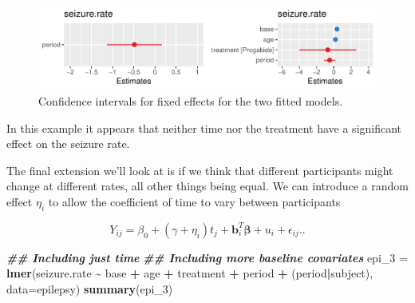 \documentclass[
  openany]{book}
\newenvironment{Shaded}{\begin{snugshade}}{\end{snugshade}}
\newcommand{\AttributeTok}[1]{\textcolor[rgb]{0.13,0.29,0.53}{#1}}
\newcommand{\DocumentationTok}[1]{\textcolor[rgb]{0.56,0.35,0.01}{\textbf{\textit{#1}}}}
\newcommand{\FunctionTok}[1]{\textcolor[rgb]{0.13,0.29,0.53}{\textbf{#1}}}
\newcommand{\NormalTok}[1]{#1}
\newcommand{\OtherTok}[1]{\textcolor[rgb]{0.56,0.35,0.01}{#1}}
\newcommand{\SpecialCharTok}[1]{\textcolor[rgb]{0.81,0.36,0.00}{\textbf{#1}}}
\theoremstyle{definition}
\theoremstyle{definition}
\theoremstyle{definition}
\theoremstyle{definition}
\theoremstyle{remark}
\begin{document}
\begin{figure}
\centering
\includegraphics{CT4H_notes_files/figure-latex/unnamed-chunk-72-1.pdf}
\caption{\label{fig:unnamed-chunk-72}Confidence intervals for fixed effects for the two fitted models.}
\end{figure}

In this example it appears that neither time nor the treatment have a significant effect on the seizure rate.

The final extension we'll look at is if we think that different participants might change at different rates, all other things being equal. We can introduce a random effect \(\eta_i\) to allow the coefficient of time to vary between participants

\begin{equation}
Y_{ij} = \beta_0 + \left(\gamma + \eta_i\right) t_j + \mathbf{b}_i^T\boldsymbol\beta + u_{i} + \epsilon_{ij}.
\label{eq:lmer3}.
\end{equation}

\begin{Shaded}
\begin{Highlighting}[]
\DocumentationTok{\#\# Including just time}
\DocumentationTok{\#\# Including more baseline covariates}
\NormalTok{epi\_3 }\OtherTok{=} \FunctionTok{lmer}\NormalTok{(seizure.rate }\SpecialCharTok{\textasciitilde{}}\NormalTok{ base }\SpecialCharTok{+}\NormalTok{ age }\SpecialCharTok{+}\NormalTok{ treatment }\SpecialCharTok{+}\NormalTok{ period }\SpecialCharTok{+}\NormalTok{ (period}\SpecialCharTok{|}\NormalTok{subject), }\AttributeTok{data=}\NormalTok{epilepsy)}
\FunctionTok{summary}\NormalTok{(epi\_3)}
\end{Highlighting}
\end{Shaded}
\end{document}
